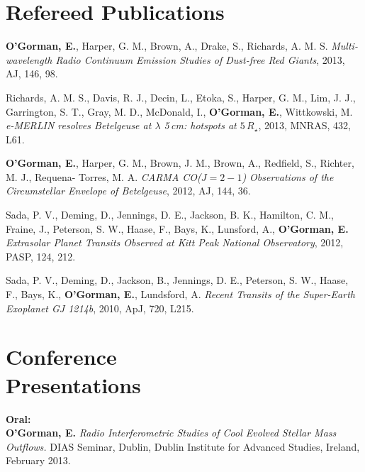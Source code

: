 \documentclass[margin,line]{resume}
\begin{document}
\begin{resume}
    \section{\mysidestyle Refereed Publications}

    \textbf{O'Gorman, E.}, Harper, G. M., Brown, A., Drake, S., Richards, A. M. S.
    \textsl{Multi-wavelength Radio Continuum Emission Studies of Dust-free Red Giants},
    2013, AJ, 146, 98.

\vspace{0mm}
    Richards, A. M. S., Davis, R. J., Decin, L., Etoka, S., Harper, G. M., Lim, J. J., Garrington, S. T., Gray, 	M. D., McDonald, I., \textbf{O'Gorman, E.}, Wittkowski, M.
    \textsl{e-MERLIN resolves Betelgeuse at $\lambda$ 5\,cm: hotspots at $5\,R_{\star}$},
    2013, MNRAS, 432, L61.

\vspace{0mm}
	\textbf{O'Gorman, E.}, Harper, G. M., Brown, J. M., Brown, A., Redfield, S., Richter, M. J., Requena-			Torres, M. A.
    \textsl{CARMA CO($J = 2-1$) Observations of the Circumstellar Envelope of Betelgeuse},
    2012, AJ, 144, 36.

\vspace{0mm}
	Sada, P. V., Deming, D., Jennings, D. E., Jackson, B. K., Hamilton, C. M., Fraine, J., Peterson, S. W., 		Haase, F., Bays, K., Lunsford, A., \textbf{O'Gorman, E.}
    \textsl{Extrasolar Planet Transits Observed at Kitt Peak National Observatory},
    2012, PASP, 124, 212.

\vspace{0mm}
	Sada, P. V., Deming, D., Jackson, B., Jennings, D. E., Peterson, S. W., Haase, F., Bays, K., \textbf{O'Gorman, E.}, Lundsford, A.
    \textsl{Recent Transits of the Super-Earth Exoplanet GJ 1214b},
    2010, ApJ, 720, L215.



    \section{\mysidestyle Conference\\Presentations}

    \textbf{Oral:} \vspace{2mm}\\\vspace{1mm}%
\textbf{O'Gorman, E.} \textit{Radio Interferometric Studies of Cool Evolved Stellar Mass Outflows.}
DIAS Seminar, Dublin, Dublin Institute for Advanced Studies, Ireland, February 2013. %
    

\end{resume}
\end{document}
